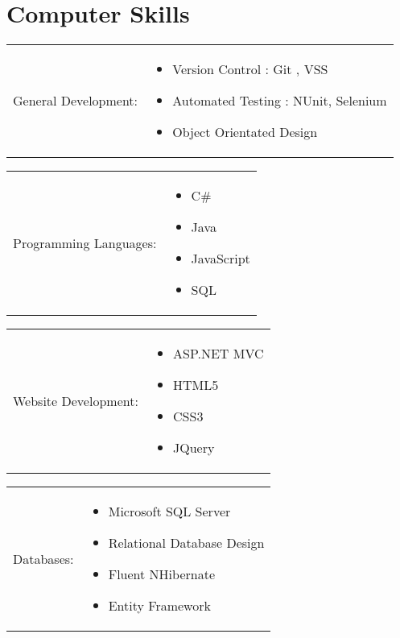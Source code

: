 \documentclass[a4paper,10pt]{article} %
\begin{document}

\section{Computer Skills}

\begin{tabular}{p{5cm}p{11cm}}
General Development:
&	\begin{itemize}
		\item Version Control : Git , VSS
		\item Automated Testing : NUnit, Selenium
		\item Object Orientated Design
	\end{itemize}\\
\end{tabular}

\begin{tabular}{rp{11cm}}
Programming Languages:
&	\begin{itemize}
		\item C\#
		\item Java
		\item JavaScript
		\item SQL
	\end{itemize}\\
\end{tabular}

\begin{tabular}{rp{11cm}}
Website Development:
&	\begin{itemize}
		\item ASP.NET MVC
		\item HTML5
		\item CSS3
		\item JQuery
	\end{itemize}\\
\end{tabular}

\begin{tabular}{rp{11cm}}
Databases:
&	\begin{itemize}
		\item Microsoft SQL Server
		\item Relational Database Design
		\item Fluent NHibernate
		\item Entity Framework
	\end{itemize}\\
\end{tabular}
\end{document}
